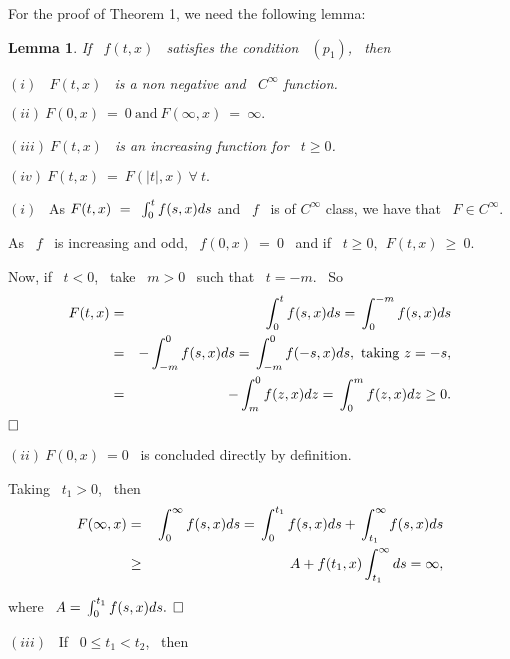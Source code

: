 \documentclass[12pt]{article}
\newtheorem{lemma}{Lemma}
\begin{document}
For the proof of Theorem 1, we need the following lemma:

\begin{lemma}
If \ $f(t,x)$ \ satisfies the condition \ $(p_1)$, \ then

\noindent  $(i)$ \ $F(t,x)$ \ is a non negative  and \ $C^{\infty}$ function.

\noindent  $(ii) \ F(0,x) \ = \ 0 \ \mbox{and} \ F(\infty,x) \ = \ \infty.$

\noindent  $(iii) \ F(t,x)$ \ is an increasing function for \ $t \geq 0$.

\noindent  $(iv) \ F(t,x) \ = \ F(|t|,x) \ \forall \ t.$
\end{lemma}


\noindent  $(i)$ \ As $F(t,x) \ = \ {\displaystyle}\int^t_0{f(s,x)ds}$ and \ $f$ \ is of $C^{\infty}$ class,
 we have that \ $F \in C^{\infty}$.

As \ $f$ \ is increasing and odd, \ $f(0,x) \ = \ 0$ \ and if \ $t \geq 0, \ \ F(t,x) \ \geq \ 0.$

Now, if \ $t < 0$, \ take \ $m > 0$ \ such that \ $t = - m$. \ So
\vspace{-0.5mm}
\begin{eqnarray*}
F(t,x) & = & {\displaystyle}\int^t_0{f(s,x)ds} = {\displaystyle}\int^{- m}_0{f(s,x)ds} \\
       & = & - {\displaystyle}\int^0_{- m}{f(s,x)ds} = {\displaystyle}\int^0_{- m}{f(- s,x)ds}, \ \mbox{taking} \ z = - s, \\
       & = & - {\displaystyle}\int^0_m{f(z,x)dz} = {\displaystyle}\int^m_0{f(z,x)dz} \geq 0.
\end{eqnarray*}
{$\hfill{\Box}$}

\noindent  $(ii) \ F(0,x) \ = 0$ \ is concluded directly by definition.

Taking \ $t_1 > 0$, \ then
\vspace{-0.5mm}
\begin{eqnarray*}
F(\infty,x) & = & {\displaystyle}\int^{\infty}_0{f(s,x)ds} = {\displaystyle}\int^{t_1}_0{f(s,x)ds} + {\displaystyle}\int^{\infty}_{t_1}{f(s,x)ds} \\
            & \geq & A + f(t_1,x){\displaystyle}\int^{\infty}_{t_1}{ds} = \infty, 
\end{eqnarray*}

\noindent where \ $A = {\displaystyle}\int^{t_1}_0{f(s,x)ds}.$ {$\hfill{\Box}$}

\noindent  $(iii)$ \ If \ $0 \leq t_1 < t_2$, \ then
\end{document}
